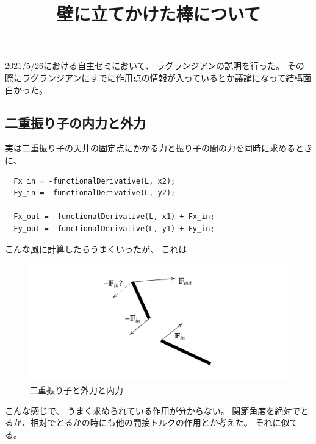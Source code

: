 \documentclass[a4paper,11pt]{jsarticle}
\begin{document}
\title{壁に立てかけた棒について}
\date{}
\maketitle

2021/5/26における自主ゼミにおいて、
ラグランジアンの説明を行った。
その際にラグランジアンにすでに作用点の情報が入っているとか議論になって結構面白かった。

\subsection{二重振り子の内力と外力}
実は二重振り子の天井の固定点にかかる力と振り子の間の力を同時に求めるときに、
\begin{lstlisting}
  Fx_in = -functionalDerivative(L, x2);
  Fy_in = -functionalDerivative(L, y2);
  
  Fx_out = -functionalDerivative(L, x1) + Fx_in;
  Fy_out = -functionalDerivative(L, y1) + Fy_in;
\end{lstlisting}
こんな風に計算したらうまくいったが、
これは
\begin{figure}[h]
  \centering
  \includegraphics[width = 1\textwidth]{double_Stick.png}
  \caption{二重振り子と外力と内力}
  \label{fig:double_Stick}
\end{figure}
こんな感じで、
うまく求められている作用が分からない。
関節角度を絶対でとるか、相対でとるかの時にも他の間接トルクの作用とか考えた。
それに似てる。
\end{document}
